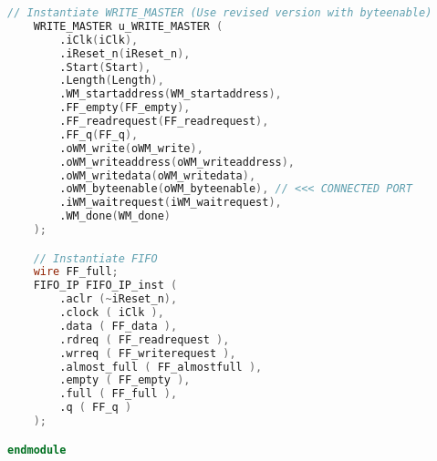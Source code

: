\begin{lstlisting}[language=Verilog, caption={DMAController.v - DMA Controller Top Module}, label=lst:verilog_dmacontroller]
    // Instantiate WRITE_MASTER (Use revised version with byteenable)
    WRITE_MASTER u_WRITE_MASTER (
        .iClk(iClk),
        .iReset_n(iReset_n),
        .Start(Start),
        .Length(Length),
        .WM_startaddress(WM_startaddress),
        .FF_empty(FF_empty),
        .FF_readrequest(FF_readrequest),
        .FF_q(FF_q),
        .oWM_write(oWM_write),
        .oWM_writeaddress(oWM_writeaddress),
        .oWM_writedata(oWM_writedata),
        .oWM_byteenable(oWM_byteenable), // <<< CONNECTED PORT
        .iWM_waitrequest(iWM_waitrequest),
        .WM_done(WM_done)
    );

    // Instantiate FIFO
    wire FF_full;
    FIFO_IP	FIFO_IP_inst (
        .aclr (~iReset_n),
        .clock ( iClk ),
        .data ( FF_data ),
        .rdreq ( FF_readrequest ),
        .wrreq ( FF_writerequest ),
        .almost_full ( FF_almostfull ),
        .empty ( FF_empty ),
        .full ( FF_full ),
        .q ( FF_q )
	);

endmodule
\end{lstlisting}

